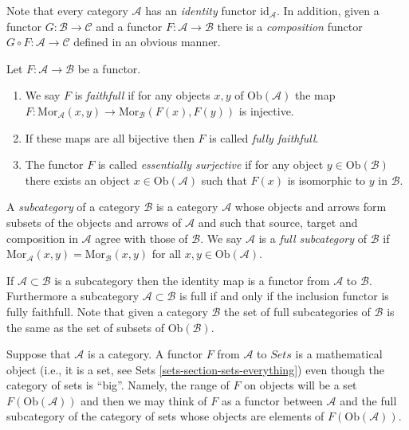 \noindent
Note that every category $\mathcal{A}$ has an
{\it identity} functor $\text{id}_\mathcal{A}$.
In addition, given a functor $G : \mathcal{B} \to \mathcal{C}$
and a functor $F : \mathcal{A} \to \mathcal{B}$ there is
a {\it composition} functor $G \circ F : \mathcal{A} \to \mathcal{C}$
defined in an obvious manner.

\begin{definition}
\label{definition-faithfull}
Let $F : \mathcal{A} \to \mathcal{B}$ be a functor.
\begin{enumerate}
\item We say $F$ is {\it faithfull} if 
for any objects $x,y$ of $\text{Ob}(\mathcal{A})$ the map
$F : \text{Mor}_\mathcal{A}(x,y) \to \text{Mor}_\mathcal{B}(F(x), F(y))$
is injective.
\item If these maps are all bijective then $F$ is called
{\it fully faithfull}.
\item
The functor $F$ is called {\it essentially surjective} if for any 
object $y \in \text{Ob}(\mathcal{B})$ there exists an object
$x \in \text{Ob}(\mathcal{A})$ such that $F(x)$ is isomorphic to $y$ in
$\mathcal{B}$.
\end{enumerate}
\end{definition}

\begin{definition}
\label{definition-subcategory}
A {\it subcategory} of a category $\mathcal{B}$ is
a category $\mathcal{A}$ whose objects and arrows
form subsets of the objects and arrows
of $\mathcal{A}$ and such that source, target
and composition in $\mathcal{A}$ agree with those
of $\mathcal{B}$. We say $\mathcal{A}$ is a
{\it full subcategory} of $\mathcal{B}$ if $\text{Mor}_{\mathcal{A}}(x,y)
= \text{Mor}_{\mathcal{B}}(x,y)$ for all $x,y \in \text{Ob}(\mathcal{A})$.
\end{definition}

\noindent
If $\mathcal{A} \subset \mathcal{B}$ is a subcategory then the
identity map is a functor from $\mathcal{A}$ to $\mathcal{B}$.
Furthermore a subcategory $\mathcal{A} \subset \mathcal{B}$
is full if and only if the inclusion functor is fully faithfull.
Note that given a category $\mathcal{B}$ the set of full subcategories
of $\mathcal{B}$ is the same as the set of subsets of
$\text{Ob}(\mathcal{B})$.

\begin{remark} 
\label{remark-functor-into-sets}
Suppose that $\mathcal{A}$ is a category.
A functor $F$ from $\mathcal{A}$ to $\textit{Sets}$
is a mathematical object (i.e., it is a set, see
Sets \autoref{sets-section-sets-everything})
even though the category of sets is ``big''.
Namely, the range of $F$ on objects will be 
a set $F(\text{Ob}(\mathcal{A}))$ and then we 
may think of $F$ as a functor between 
$\mathcal{A}$ and the full subcategory
of the category of sets whose
objects are elements of $F(\text{Ob}(\mathcal{A}))$.
\end{remark}

